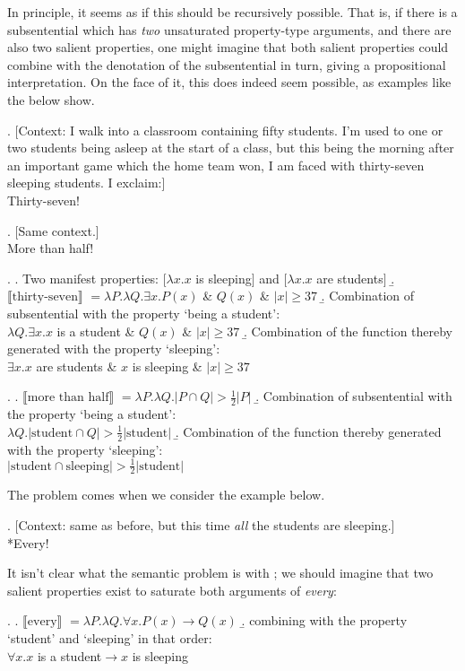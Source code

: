 \documentclass[doublespace]{umthesis}
\newcommand{\ext}[1]{\ensuremath{\llbracket \textrm{{#1}} \rrbracket}}
\newcommand{\pred}[1]{\ensuremath{\mathrm{{#1}}}}
\begin{document}
In principle, it seems as if this should be recursively possible. That is, if there is a subsentential which has \emph{two} unsaturated property-type arguments, and there are also two salient properties, one might imagine that both salient properties could combine with the denotation of the subsentential in turn, giving a propositional interpretation. On the face of it, this does indeed seem possible, as examples like the below show.

\ex. 	[Context: I walk into a classroom containing fifty students. I'm used to one or two students being asleep at the start of a class, but this being the morning after an important game which the home team won, I am faced with thirty-seven sleeping students. I exclaim:]\\
	Thirty-seven!
	
\ex. 	[Same context.]\\
	More than half!
	
\ex. 	\a. Two manifest properties: $[\lambda x. x$ is sleeping$]$ and $[\lambda x. x$ are students$]$
	\b. \ext{thirty-seven} $ = \lambda P. \lambda Q. \exists x. P(x) $ \& $Q(x) $ \& $|x| \geq 37$
	\b. Combination of subsentential with the property `being a student':\\
		$\lambda Q. \exists x. x$ is a student \& $Q(x)$ \& $|x| \geq 37$
	\b. Combination of the function thereby generated with the property `sleeping':\\
		$\exists x. x$ are students \& $x$ is sleeping \& $|x| \geq 37$
		
\ex. 	\a. \ext{more than half} $ = \lambda P. \lambda Q. |P \cap Q| > \frac{1}{2} |P|$
	\b. Combination of subsentential with the property `being a student':\\
		$\lambda Q. |\pred{student} \cap Q| > \frac{1}{2} |\pred{student}|$
	\b. Combination of the function thereby generated with the property `sleeping':\\
		$|\pred{student} \cap \pred{sleeping}| > \frac{1}{2} |\pred{student}|$
		
The problem comes when we consider the example below.

\ex. 	[Context: same as before, but this time \emph{all} the students are sleeping.]\\
	{}*Every!
	
It isn't clear what the semantic problem is with \Last; we should imagine that two salient properties exist to saturate both arguments of {\it every}:

\ex. 	\a. \ext{every} $= \lambda P. \lambda Q. \forall x. P(x) \rightarrow Q(x)$
	\b. combining with the property `student' and `sleeping' in that order:\\
		$\forall x. x$ is a student$ \rightarrow x$ is sleeping 
		
\end{document}
